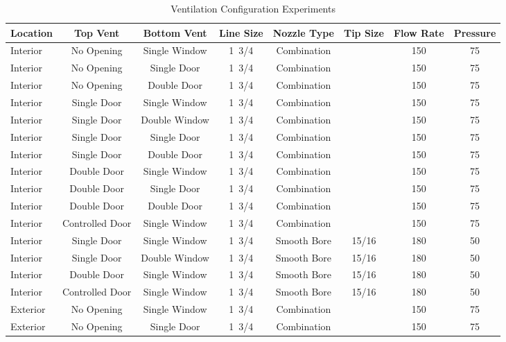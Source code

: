 \documentclass[12pt,oneside]{book}
\begin{document}
\begin{table}[!ht]
\centering
\footnotesize
\caption{Ventilation Configuration Experiments}
\label{tab:Ventilation_Configuration_Experiments}
\begin{tabular}{lccccccc}
\toprule[1.5pt]
Location & Top Vent        & Bottom Vent     & Line Size & Nozzle Type & Tip Size & Flow Rate & Pressure \\ 
\midrule
Interior & No Opening      & Single Window   & 1~3/4 & Combination &       & 150 & 75 \\
Interior & No Opening      & Single Door     & 1~3/4 & Combination &       & 150 & 75 \\
Interior & No Opening      & Double Door     & 1~3/4 & Combination &       & 150 & 75 \\
Interior & Single Door     & Single Window   & 1~3/4 & Combination &       & 150 & 75 \\
Interior & Single Door     & Double Window   & 1~3/4 & Combination &       & 150 & 75 \\
Interior & Single Door     & Single Door     & 1~3/4 & Combination &       & 150 & 75 \\
Interior & Single Door     & Double Door     & 1~3/4 & Combination &       & 150 & 75 \\
Interior & Double Door     & Single Window   & 1~3/4 & Combination &       & 150 & 75 \\
Interior & Double Door     & Single Door     & 1~3/4 & Combination &       & 150 & 75 \\
Interior & Double Door     & Double Door     & 1~3/4 & Combination &       & 150 & 75 \\
Interior & Controlled Door & Single Window   & 1~3/4 & Combination &       & 150 & 75 \\
Interior & Single Door     & Single Window   & 1~3/4 & Smooth Bore & 15/16 & 180 & 50 \\
Interior & Single Door     & Double Window   & 1~3/4 & Smooth Bore & 15/16 & 180 & 50 \\
Interior & Double Door     & Single Window   & 1~3/4 & Smooth Bore & 15/16 & 180 & 50 \\
Interior & Controlled Door & Single Window   & 1~3/4 & Smooth Bore & 15/16 & 180 & 50 \\
\midrule
Exterior & No Opening      & Single Window   & 1~3/4 & Combination &       & 150 & 75 \\
Exterior & No Opening      & Single Door     & 1~3/4 & Combination &       & 150 & 75 \\

\end{tabular}
\end{table}
\end{document}

